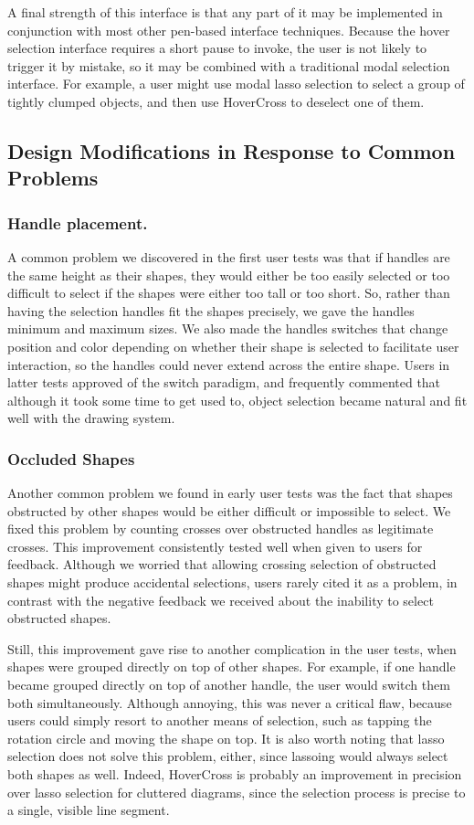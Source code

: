 \documentclass{article}
\begin{document}
A final strength of this interface is that any part of it may be
implemented in conjunction with most other pen-based interface techniques.  
Because the hover selection interface requires a short pause to invoke, the
user is not likely to trigger it by mistake, so it may be combined
with a traditional modal selection interface.  For example, a user
might use modal lasso selection to select a group of tightly clumped
objects, and then use HoverCross to deselect one of them.


\subsection{Design Modifications in Response to Common Problems}

\subsubsection{Handle placement.}  
A common problem we discovered in the first user tests was that if handles are the same height as their shapes, they would either be too easily selected or too difficult to select if the shapes were either too tall or too short.  So, rather than having the selection handles fit the shapes precisely, we gave the handles minimum and maximum sizes.  We also made the handles switches that change position and color depending on whether their shape is selected to facilitate user interaction, so the handles could never extend across the entire shape.  Users in latter tests approved of the switch paradigm, and frequently commented that although it took some time to get used to, object selection became natural and fit well with the drawing system.

\subsubsection{Occluded Shapes}
Another common problem we found in early user tests was the fact that shapes obstructed by other shapes would be either difficult or impossible to select.  We fixed this problem by counting crosses over obstructed handles as legitimate crosses.  This improvement consistently tested well when given to users for feedback.  Although we worried that allowing crossing selection of obstructed shapes might produce accidental selections, users rarely cited it as a problem, in contrast with the negative feedback we received about the inability to select obstructed shapes.

Still, this improvement gave rise to another complication in the user tests, when shapes were grouped directly on top of other shapes.  For example, if one handle became grouped directly on top of another handle, the user would switch them both simultaneously.  Although annoying, this was never a critical flaw, because users could simply resort to another means of selection, such as tapping the rotation circle and moving the shape on top.  It is also worth noting that lasso selection does not solve this problem, either, since lassoing would always select both shapes as well.  Indeed, HoverCross is probably an improvement in precision over lasso selection for cluttered diagrams, since the selection process is precise to a single, visible line segment.
\end{document}
